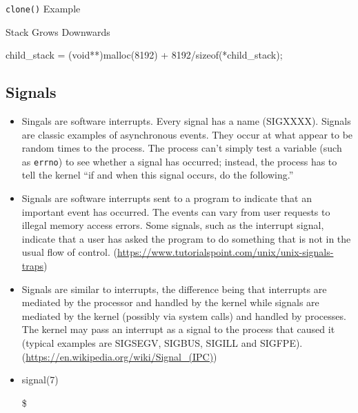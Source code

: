 \begin{frame}{\texttt{clone()} Example}
  \begin{center}
     
  \end{center}
\end{frame}

\begin{frame}[fragile]{Stack Grows Downwards}
\begin{ccode}
child_stack = (void**)malloc(8192) + 8192/sizeof(*child_stack);
\end{ccode}
\end{frame}

\subsection{Signals}
\label{sec:signals}

\begin{itemize}
\item Singals are software interrupts. Every signal has a name (SIGXXXX). Signals are
  classic examples of asynchronous events. They occur at what appear to be random times to
  the process. The process can't simply test a variable (such as \texttt{errno}) to see
  whether a signal has occurred; instead, the process has to tell the kernel ``if and when
  this signal occurs, do the following.'' 
\item Signals are software interrupts sent to a program to indicate that an important
  event has occurred. The events can vary from user requests to illegal memory access
  errors. Some signals, such as the interrupt signal, indicate that a user has asked the
  program to do something that is not in the usual flow of
  control. (\url{https://www.tutorialspoint.com/unix/unix-signals-traps})
\item Signals are similar to interrupts, the difference being that interrupts are mediated
  by the processor and handled by the kernel while signals are mediated by the kernel
  (possibly via system calls) and handled by processes. The kernel may pass an interrupt
  as a signal to the process that caused it (typical examples are SIGSEGV, SIGBUS, SIGILL
  and SIGFPE). (\url{https://en.wikipedia.org/wiki/Signal_(IPC)})
\item signal(7)
\item[\$] 
\end{itemize}

